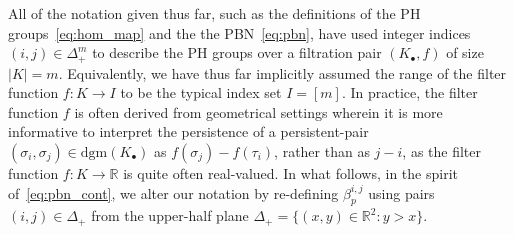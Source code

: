 \documentclass[10pt]{article}
\numberwithin{equation}{section}
\newcommand{\+}{%
	\raisebox{0.18ex}{\scaleobj{0.55}{+}}
}
\theoremstyle{definition}
\begin{document}
All of the notation given thus far, such as the definitions of the PH groups~\eqref{eq:hom_map} and the the PBN~\eqref{eq:pbn}, have used integer indices $(i,j) \in \Delta_+^m$ to describe the PH groups over a filtration pair $(K_\bullet, f)$ of size $\lvert K \rvert = m$. Equivalently, we have thus far implicitly assumed the range of the filter function $f : K \to I$ to be the typical index set $I = [m]$.
In practice, the filter function $f$ is often derived from geometrical settings wherein it is more informative to interpret the persistence of a persistent-pair $(\sigma_i, \sigma_j) \in \mathrm{dgm}(K_\bullet)$ as $f(\sigma_j) - f(\tau_i)$, rather than as $j - i$, as the filter function $f : K \to \mathbb{R}$ is quite often real-valued.
In what follows, in the spirit of~\eqref{eq:pbn_cont}, we alter our notation by re-defining $\beta_p^{i,j}$ using pairs $(i,j) \in \Delta_{+}$ from the upper-half plane $\Delta_{+} = \{ (x,y) \in \mathbb{R}^2 : y > x \} $.

\end{document}
